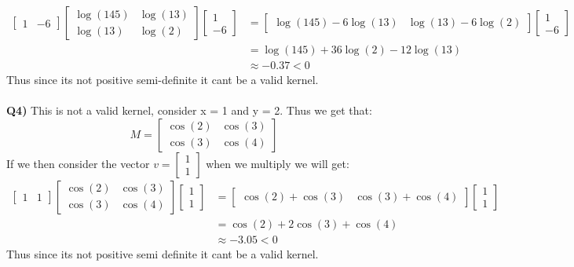 \documentclass{article}
\begin{document}
\begin{titlepage}
\begin{align*}
\begin{bmatrix} 1 &
-6
\end{bmatrix} \begin{bmatrix}
\log(145) & \log(13) \\
\log(13) & \log(2)
\end{bmatrix} \begin{bmatrix} 1 \\
-6
\end{bmatrix} &= \begin{bmatrix} \log(145) - 6\log(13) &
\log(13) - 6\log(2)
\end{bmatrix} \begin{bmatrix} 1 \\
-6
\end{bmatrix} \\
&= \log(145)+36\log(2)-12\log(13) \\
&\approx -0.37
< 0
\end{align*}
Thus since its not positive semi-definite it cant be a valid kernel.\\\\
\textbf{Q4)} This is not a valid kernel, consider x = 1 and y = 2. Thus we get that:
\[ M = \begin{bmatrix}
\cos(2) & \cos(3) \\
\cos(3) & \cos(4)
\end{bmatrix} \]
If we then consider the vector $v = \begin{bmatrix} 1 \\
1
\end{bmatrix}$ when we multiply we will get:
\begin{align*}
\begin{bmatrix} 1 &
1
\end{bmatrix} \begin{bmatrix}
\cos(2) & \cos(3) \\
\cos(3) & \cos(4)
\end{bmatrix} \begin{bmatrix} 1 \\
1
\end{bmatrix} &= \begin{bmatrix} \cos(2) + \cos(3) &
\cos(3) + \cos(4)
\end{bmatrix} \begin{bmatrix} 1 \\
1
\end{bmatrix} \\
&= \cos(2) + 2\cos(3) + \cos(4) \\
&\approx -3.05
< 0
\end{align*}
Thus since its not positive semi definite it cant be a valid kernel.
\end{titlepage}
\end{document}
